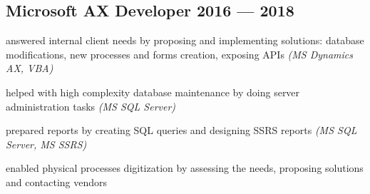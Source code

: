 \documentclass[letter,10pt]{article}
\begin{document}
\subsection{{Microsoft AX Developer \hfill 2016 --- 2018}}
\begin{zitemize}
\item answered internal client needs by proposing and implementing solutions: database modifications, new processes and forms creation, exposing APIs \emph{(MS Dynamics AX, VBA)}
\item helped with high complexity database maintenance by doing server administration tasks \emph{(MS SQL Server)}
\item prepared reports by creating SQL queries and designing SSRS reports \emph{(MS SQL Server, MS SSRS)}
\item enabled physical processes digitization by assessing the needs, proposing solutions and contacting vendors
\end{zitemize}
\end{document}
